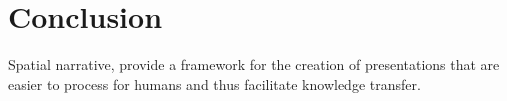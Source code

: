 \documentclass[twoside, 12pt]{article}
\newcommand{\sys}{\textsc{RPresentation}\xspace}
\begin{document}
\section{Conclusion}
\label{sec:conclusion}
Spatial narrative, provide a framework for the creation of presentations that are easier to process for humans and thus facilitate knowledge transfer.\\




\newpage

{}

\end{document}
